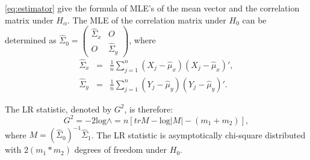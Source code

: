 \documentclass[a4paper]{article}
\begin{document}
\ref{eq:estimator} give the formula of MLE's of the mean vector and
the correlation matrix under $H_\alpha$. The MLE of the correlation
matrix under $H_0$ can be determined as
$\hat{\Sigma}_0= \left( \begin{array} {cc} \hat{\Sigma}_x & O \\
O & \hat{\Sigma}_y \end{array} \right)$, where
\begin{eqnarray}
\hat{\Sigma}_x &=&
\frac{1}{n}\sum_{j=1}^{n}(X_{j}-\hat{\mu}_x)(X_{j}-\hat{\mu}_x)',\\
\hat{\Sigma}_y &=&
\frac{1}{n}\sum_{j=1}^{n}(Y_{j}-\hat{\mu}_y)(Y_{j}-\hat{\mu}_y)'.
\end{eqnarray}

The LR statistic, denoted by $G^2$, is therefore:
\begin{equation}
G^2 = -2\mathrm{log} \wedge = n [tr M -\mathrm{log} |M| -(m_1+m_2)],
\end{equation}
where $M = (\hat{\Sigma}_0)^{-1}\hat{\Sigma}_1$. The LR statistic is
asymptotically chi-square distributed with $2(m_1*m_2)$ degrees of
freedom under $H_0$.
\end{document}
